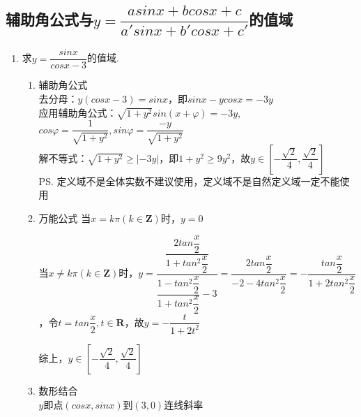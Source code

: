\subsection*{辅助角公式与$y = \dfrac{asinx+bcosx+c}{a'sinx+b'cosx+c'}$的值域}
\begin{enumerate}
    \item 求$y = \dfrac{sinx}{cosx - 3}$的值域.
    \begin{jieda}
        \begin{enumerate}
            \item 辅助角公式 \\
            去分母：$y (cosx - 3) = sinx$，即$sinx - y cosx = -3y$ \\
            应用辅助角公式：$\sqrt{1+y^2}sin(x+\varphi) = -3y$,$cos\varphi = \dfrac{1}{\sqrt{1+y^2}}, sin\varphi = \dfrac{-y}{\sqrt{1+y^2}}$ \\
            解不等式：$\sqrt{1+y^2} \geq |-3y|$，即$1+y^2 \geq 9y^2$，故$y \in \left[-\dfrac{\sqrt{2}}{4}, \dfrac{\sqrt{2}}{4}\right]$ \\
            \ps 定义域不是全体实数不建议使用，定义域不是自然定义域一定不能使用
            \item 万能公式
            当$x = k\pi (k \in \mathbf{Z})$时，$y = 0$
            
            当$x \neq k\pi (k \in \mathbf{Z})$时，$y = \dfrac{\dfrac{2tan\dfrac{x}{2}}{1+tan^2\dfrac{x}{2}}}{\dfrac{1-tan^2\dfrac{x}{2}}{1+tan^2\dfrac{x}{2}} - 3} = \dfrac{2tan\dfrac{x}{2}}{-2-4tan^2\dfrac{x}{2}} = -\dfrac{tan\dfrac{x}{2}}{1+2tan^2\dfrac{x}{2}}$，令$t = tan\dfrac{x}{2}, t \in \mathbf{R}$，故$y = -\dfrac{t}{1+2t^2}$
            综上，$y \in \left[-\dfrac{\sqrt{2}}{4}, \dfrac{\sqrt{2}}{4}\right]$
            \item 数形结合 \\
            $y$即点$(cosx, sinx)$到$(3, 0)$连线斜率
        \end{enumerate}
    \end{jieda}
\end{enumerate}